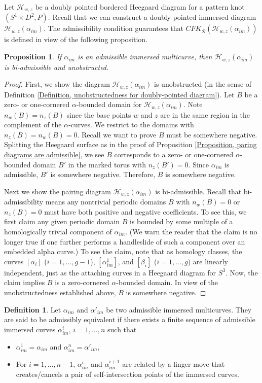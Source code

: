 \documentclass{amsart}
\newtheorem{prop}[thm]{Proposition}
\theoremstyle{definition}
\newtheorem{defn}[thm]{Definition}
\theoremstyle{remark}
\numberwithin{equation}{section}
\numberwithin{equation}{section} \makeatletter
\begin{document}
Let $\mathcal{H}_{w,z}$ be a doubly pointed bordered Heegaard diagram for a pattern knot $(S^1\times D^2,P)$. Recall that we can construct a doubly pointed immersed diagram $\mathcal{H}_{w,z}(\alpha_{im})$. The admissibility condition guarantees that $CFK_{\mathcal{R}}(\mathcal{H}_{w,z}(\alpha_{im}))$ is defined in view of the following proposition.
\begin{prop}\label{Proposition, H_w,z(alpha_im) is bi-admissible and unobstructed}
 If $\alpha_{im}$ is an admissible immersed multicurve, then $\mathcal{H}_{w,z}(\alpha_{im})$ is bi-admissible and unobstructed.  
\end{prop}
\begin{proof}
	First, we show the diagram $\mathcal{H}_{w,z}(\alpha_{im})$ is unobstructed (in the sense of Definition \ref{Definition, unobstructedness for doubly-pointed diagram}). Let $B$ be a zero- or one-cornered $\alpha$-bounded domain for $\mathcal{H}_{w,z}(\alpha_{im})$. Note $n_w(B)=n_z(B)$ since the base points $w$ and $z$ are in the same region in the complement of the $\alpha$-curves. We restrict to the domains with $n_z(B)=n_w(B)=0$. Recall we want to prove $B$ must be somewhere negative. Splitting the Heegaard surface as in the proof of Proposition \ref{Proposition, paring diagrams are admissible},  we see $B$ corresponds to a zero- or one-cornered $\alpha$-bounded domain $B'$ in the marked torus with $n_z(B')=0$. Since $\alpha_{im}$ is admissible, $B'$ is somewhere negative. Therefore, $B$ is somewhere negative. 
	
	Next we show the pairing diagram $\mathcal{H}_{w,z}(\alpha_{im})$ is bi-admissible. Recall that bi-admissibility means any nontrivial periodic domains $B$ with $n_w(B)=0$ or $n_z(B)=0$ must have both positive and negative coefficients. To see this, we first claim any given periodic domain $B$ is bounded by some multiple of a homologically trivial component of $\alpha_{im}$. (We warn the reader that the claim is no longer true if one further performs a handleslide of such a component over an embedded alpha curve.) To see the claim, note that as homology classes, the curves $[\alpha_i]$ ($i=1,\ldots,g-1$), $[\alpha^1_{im}]$, and $[\beta_i]$ ($i=1,\ldots, g$) are linearly independent, just as the attaching curves in a Heegaard diagram for $S^3$. Now, the claim implies $B$ is a zero-cornered $\alpha$-bounded domain. In view of the unobstructedness established above, $B$ is somewhere negative. 
\end{proof}

\begin{defn}
	Let $\alpha_{im}$ and $\alpha'_{im}$ be two admissible immersed multicurves. They are said to be admissibly equivalent if there exists a finite sequence of admissible immersed curves $\alpha^i_{im}$, $i=1,\ldots,n$ such that 
	\begin{itemize}
		\item[(1)]$\alpha^1_{im}=\alpha_{im}$ and $\alpha^n_{im}=\alpha'_{im}$,
		\item[(2)]For $i=1,\ldots, n-1$, $\alpha^i_{im}$ and $\alpha^{i+1}_{im}$ are related by a finger move that creates/cancels a pair of self-intersection points of the immersed curves. 
	\end{itemize}
\end{defn}
\end{document}
